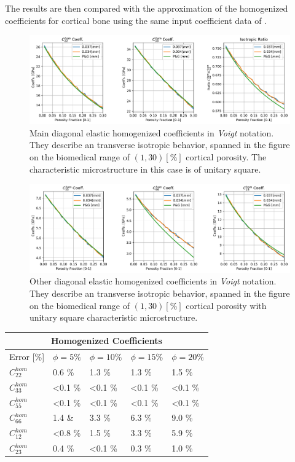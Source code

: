 The results are then compared with the approximation of the homogenized coefficients for cortical bone using the same input coefficient data of \cite{Parnell2008}.

\begin{figure}[!h]
	\centering
	\includegraphics[scale=.5]{images/CellsProb/CellProb_MainHomCoeffsCircular.pdf}
	\caption{Main diagonal elastic homogenized coefficients in \textit{Voigt} notation. They describe an transverse isotropic behavior, spanned in the figure on the biomedical range of $(1,30) [\%]$ cortical porosity. The characteristic microstructure in this case is of unitary square.}
	\label{MainHomCoeffsSquare}
\end{figure}

\begin{figure}[!h]
	\centering
	\includegraphics[scale=.5]{images/CellsProb/CellProb_OthersHomCoeffsCircular.pdf}
	\caption{Other diagonal elastic homogenized coefficients in \textit{Voigt} notation. They describe an transverse isotropic behavior, spanned in the figure on the biomedical range of $(1,30) [\%]$ cortical porosity with unitary square characteristic microstructure.}
	\label{OtherHomCoeffsSquare}
\end{figure}

\begin{center}
\begin{tabular}{ |p{2.5cm}||p{2cm}|p{2cm}|p{2cm}|p{2cm}| }
 \hline
 \multicolumn{5}{|c|}{Homogenized Coefficients} \\
 \hline
 Error [\%] & $\phi = 5 \%$ & $\phi = 10 \%$ & $\phi = 15 \%$ & $\phi = 20 \%$ \\
 \hline
 $C^{hom}_{22}$ & 0.6 \% & 1.3 \% & 1.3 \% & 1.5 \% \\
 $C^{hom}_{33}$ & <0.1 \% & <0.1 \% & <0.1 \% & <0.1 \% \\
 $C^{hom}_{55}$ & <0.1 \% & <0.1 \% & <0.1 \% & <0.1 \% \\
 $C^{hom}_{66}$ & 1.4 \& & 3.3 \% & 6.3 \% & 9.0 \% \\
 $C^{hom}_{12}$ & <0.8 \% & 1.5 \% & 3.3 \% & 5.9 \% \\
 $C^{hom}_{23}$ & 0.4 \% & <0.1 \% & 0.3 \% & 1.0 \% \\
 \hline
\end{tabular}
\end{center}

